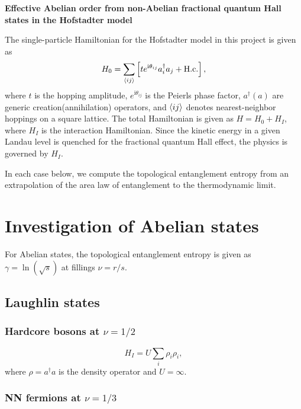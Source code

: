 \documentclass[floatfix,showpacs,amsmath,amsfonts,amssymb,aps,twocolumn, prb,groupedaddress]{revtex4-1}
\begin{document}
\onecolumngrid

\begin{center}
	\textbf{\large Effective Abelian order from non-Abelian fractional quantum Hall states in the Hofstadter model}
\end{center}
\vspace{-1em}
\tableofcontents
\vspace{1em}

The single-particle Hamiltonian for the Hofstadter model in this project is given as
\begin{equation}
\label{eq:single_ham}
H_0 = \sum_{\braket{ij}} \left[ t e^{\mathrm{i}\theta_{ij}} a_i^\dagger a_j + \text{H.c.} \right],
\end{equation}
where $t$ is the hopping amplitude, $e^{\mathrm{i}\theta_{ij}}$ is the Peierls phase factor, $a^\dagger(a)$ are generic creation(annihilation) operators, and $\braket{ij}$ denotes nearest-neighbor hoppings on a square lattice. The total Hamiltonian is given as $H=H_0+H_I$, where $H_I$ is the interaction Hamiltonian. Since the kinetic energy in a given Landau level is quenched for the fractional quantum Hall effect, the physics is governed by $H_I$.

In each case below, we compute the topological entanglement entropy from an extrapolation of the area law of entanglement to the thermodynamic limit.

\section{Investigation of Abelian states}

For Abelian states, the topological entanglement entropy is given as $\gamma=\ln(\sqrt{s})$ at fillings $\nu=r/s$.~\cite{Estienne15}

\subsection{Laughlin states}

\subsubsection{Hardcore bosons at $\nu=1/2$}

\begin{equation}
H_I = U \sum_i \rho_i \rho_i,
\end{equation}
where $\rho=a^\dagger a$ is the density operator and $U=\infty$.

\subsubsection{NN fermions at $\nu=1/3$}
\end{document}

